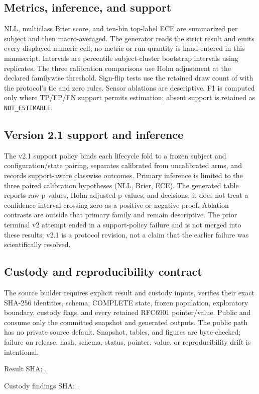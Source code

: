 \documentclass[11pt]{article}
\begin{document}
\subsection{Metrics, inference, and support}
NLL, multiclass Brier score, and ten-bin top-label ECE are summarized per subject and then macro-averaged. The generator reads the strict result and emits every displayed numeric cell; no metric or run quantity is hand-entered in this manuscript. Intervals are percentile subject-cluster bootstrap intervals using \bootstrapReplicates{} replicates. The three calibration comparisons use Holm adjustment at the declared familywise threshold. Sign-flip tests use the retained draw count of \signFlipDraws{} with the protocol's tie and zero rules. Sensor ablations are descriptive. F1 is computed only where TP/FP/FN support permits estimation; absent support is retained as \texttt{NOT\_ESTIMABLE}.

\subsection{Version 2.1 support and inference}
The v2.1 support policy binds each lifecycle fold to a frozen subject and configuration/state pairing, separates calibrated from uncalibrated arms, and records support-aware classwise outcomes. Primary inference is limited to the three paired calibration hypotheses (NLL, Brier, ECE). The generated table reports raw p-values, Holm-adjusted p-values, and decisions; it does not treat a confidence interval crossing zero as a positive or negative proof. Ablation contrasts are outside that primary family and remain descriptive. The prior terminal v2 attempt ended in a support-policy failure and is not merged into these results; v2.1 is a protocol revision, not a claim that the earlier failure was scientifically resolved.

\subsection{Custody and reproducibility contract}
The source builder requires explicit result and custody inputs, verifies their exact SHA-256 identities, schema, COMPLETE state, frozen population, exploratory boundary, custody flags, and every retained RFC6901 pointer/value. Public  and  consume only the committed snapshot and generated outputs. The public path has no private source default. Snapshot, tables, and figures are byte-checked; failure on release, hash, schema, status, pointer, value, or reproducibility drift is intentional.
\par\small\noindent Result SHA: \resultSHA.
\par\noindent Custody findings SHA: \custodySHA.\normalsize
\end{document}
